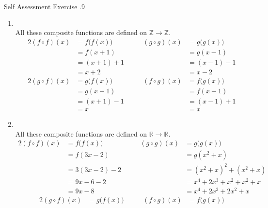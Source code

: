 \documentclass[../notes.tex]{subfiles}
\begin{document}
			\begin{exercise}{Self Assessment Exercise \thechapter.9}
				\begin{enumerate}[label=(\alph*)]
					\item {}\\
						All these composite functions are defined on $\mathbb{Z} \rightarrow \mathbb{Z}$.
						\begin{alignat*}{2}
							(f \circ f)(x) &= f\bigl(f(x)\bigr) \qquad & (g \circ g)(x) &= g\bigl(g(x)\bigr)\\
							&= f(x + 1) \qquad & &= g(x - 1)\\
							&= (x + 1) + 1 \qquad & &= (x - 1) - 1\\
							&= x + 2 \qquad & &= x - 2
						\end{alignat*}
						\begin{alignat*}{2}
							(g \circ f)(x) &= g\bigl(f(x)\bigr) \qquad & (f \circ g)(x) &= f\bigl(g(x)\bigr)\\
							&= g(x + 1) \qquad & &= f(x - 1)\\
							&= (x + 1) - 1 \qquad & &= (x - 1) + 1\\
							&= x \qquad & &= x
						\end{alignat*}
					\item {}\\
						All these composite functions are defined on $\mathbb{R} \rightarrow \mathbb{R}$.
						\begin{alignat*}{2}
							(f \circ f)(x) &= f\bigl(f(x)\bigr) \qquad & (g \circ g)(x) &= g\bigl(g(x)\bigr)\\
							&= f(3x - 2) \qquad & &= g\left(x^{2} + x\right)\\
							&= 3(3x - 2) - 2 \qquad & &= \left(x^{2} + x\right)^{2} + \left(x^{2} + x\right)\\
							&= 9x - 6 - 2 \qquad & &= x^{4} + 2x^{3} + x^{2} + x^{2} + x\\
							&= 9x - 8 \qquad & &= x^{4} + 2x^{3} + 2x^{2} + x
						\end{alignat*}
						\begin{alignat*}{2}
							(g \circ f)(x) &= g\bigl(f(x)\bigr) \qquad & (f \circ g)(x) &= f\bigl(g(x)\bigr)\\

\end{alignat*}
\end{enumerate}
\end{exercise}
\end{document}
